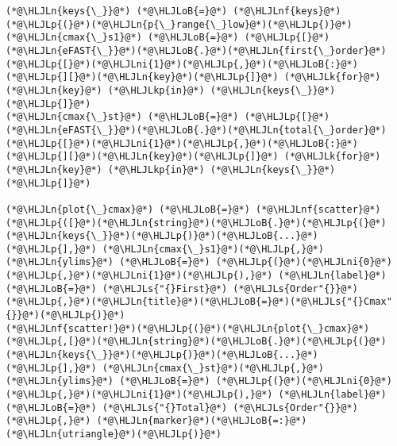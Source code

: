 \documentclass[12pt,a4paper]{article}
\newcommand{\HLJLk}[1]{\textcolor[RGB]{148,91,176}{\textbf{#1}}}
\newcommand{\HLJLkp}[1]{\textcolor[RGB]{148,91,176}{\textbf{#1}}}
\newcommand{\HLJLn}[1]{#1}
\newcommand{\HLJLnf}[1]{\textcolor[RGB]{66,102,213}{#1}}
\newcommand{\HLJLs}[1]{\textcolor[RGB]{201,61,57}{#1}}
\newcommand{\HLJLni}[1]{\textcolor[RGB]{59,151,46}{#1}}
\newcommand{\HLJLoB}[1]{\textcolor[RGB]{102,102,102}{\textbf{#1}}}
\newcommand{\HLJLp}[1]{#1}
\begin{document}
\begin{lstlisting}
(*@\HLJLn{keys{\_}}@*) (*@\HLJLoB{=}@*) (*@\HLJLnf{keys}@*)(*@\HLJLp{(}@*)(*@\HLJLn{p{\_}range{\_}low}@*)(*@\HLJLp{)}@*)
(*@\HLJLn{cmax{\_}s1}@*) (*@\HLJLoB{=}@*) (*@\HLJLp{[}@*)(*@\HLJLn{eFAST{\_}}@*)(*@\HLJLoB{.}@*)(*@\HLJLn{first{\_}order}@*)(*@\HLJLp{[}@*)(*@\HLJLni{1}@*)(*@\HLJLp{,}@*)(*@\HLJLoB{:}@*)(*@\HLJLp{][}@*)(*@\HLJLn{key}@*)(*@\HLJLp{]}@*) (*@\HLJLk{for}@*) (*@\HLJLn{key}@*) (*@\HLJLkp{in}@*) (*@\HLJLn{keys{\_}}@*)(*@\HLJLp{]}@*)
(*@\HLJLn{cmax{\_}st}@*) (*@\HLJLoB{=}@*) (*@\HLJLp{[}@*)(*@\HLJLn{eFAST{\_}}@*)(*@\HLJLoB{.}@*)(*@\HLJLn{total{\_}order}@*)(*@\HLJLp{[}@*)(*@\HLJLni{1}@*)(*@\HLJLp{,}@*)(*@\HLJLoB{:}@*)(*@\HLJLp{][}@*)(*@\HLJLn{key}@*)(*@\HLJLp{]}@*) (*@\HLJLk{for}@*) (*@\HLJLn{key}@*) (*@\HLJLkp{in}@*) (*@\HLJLn{keys{\_}}@*)(*@\HLJLp{]}@*)

(*@\HLJLn{plot{\_}cmax}@*) (*@\HLJLoB{=}@*) (*@\HLJLnf{scatter}@*)(*@\HLJLp{([}@*)(*@\HLJLn{string}@*)(*@\HLJLoB{.}@*)(*@\HLJLp{(}@*)(*@\HLJLn{keys{\_}}@*)(*@\HLJLp{)}@*)(*@\HLJLoB{...}@*)(*@\HLJLp{],}@*) (*@\HLJLn{cmax{\_}s1}@*)(*@\HLJLp{,}@*) (*@\HLJLn{ylims}@*) (*@\HLJLoB{=}@*) (*@\HLJLp{(}@*)(*@\HLJLni{0}@*)(*@\HLJLp{,}@*)(*@\HLJLni{1}@*)(*@\HLJLp{),}@*) (*@\HLJLn{label}@*) (*@\HLJLoB{=}@*) (*@\HLJLs{"{}First}@*) (*@\HLJLs{Order"{}}@*)(*@\HLJLp{,}@*)(*@\HLJLn{title}@*)(*@\HLJLoB{=}@*)(*@\HLJLs{"{}Cmax"{}}@*)(*@\HLJLp{)}@*)
(*@\HLJLnf{scatter!}@*)(*@\HLJLp{(}@*)(*@\HLJLn{plot{\_}cmax}@*)(*@\HLJLp{,[}@*)(*@\HLJLn{string}@*)(*@\HLJLoB{.}@*)(*@\HLJLp{(}@*)(*@\HLJLn{keys{\_}}@*)(*@\HLJLp{)}@*)(*@\HLJLoB{...}@*)(*@\HLJLp{],}@*) (*@\HLJLn{cmax{\_}st}@*)(*@\HLJLp{,}@*) (*@\HLJLn{ylims}@*) (*@\HLJLoB{=}@*) (*@\HLJLp{(}@*)(*@\HLJLni{0}@*)(*@\HLJLp{,}@*)(*@\HLJLni{1}@*)(*@\HLJLp{),}@*) (*@\HLJLn{label}@*) (*@\HLJLoB{=}@*) (*@\HLJLs{"{}Total}@*) (*@\HLJLs{Order"{}}@*)(*@\HLJLp{,}@*) (*@\HLJLn{marker}@*)(*@\HLJLoB{=:}@*)(*@\HLJLn{utriangle}@*)(*@\HLJLp{)}@*)


\end{lstlisting}
\end{document}
